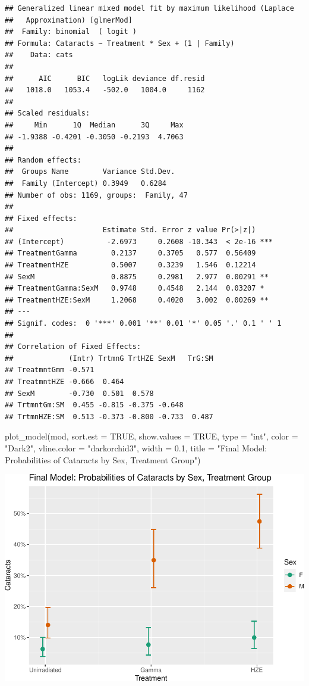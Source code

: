 \documentclass[
]{article}
\newenvironment{Shaded}{\begin{snugshade}}{\end{snugshade}}
\newcommand{\AttributeTok}[1]{\textcolor[rgb]{0.77,0.63,0.00}{#1}}
\newcommand{\ConstantTok}[1]{\textcolor[rgb]{0.00,0.00,0.00}{#1}}
\newcommand{\FloatTok}[1]{\textcolor[rgb]{0.00,0.00,0.81}{#1}}
\newcommand{\FunctionTok}[1]{\textcolor[rgb]{0.00,0.00,0.00}{#1}}
\newcommand{\NormalTok}[1]{#1}
\newcommand{\StringTok}[1]{\textcolor[rgb]{0.31,0.60,0.02}{#1}}
\begin{document}
\begin{verbatim}
## Generalized linear mixed model fit by maximum likelihood (Laplace
##   Approximation) [glmerMod]
##  Family: binomial  ( logit )
## Formula: Cataracts ~ Treatment * Sex + (1 | Family)
##    Data: cats
## 
##      AIC      BIC   logLik deviance df.resid 
##   1018.0   1053.4   -502.0   1004.0     1162 
## 
## Scaled residuals: 
##     Min      1Q  Median      3Q     Max 
## -1.9388 -0.4201 -0.3050 -0.2193  4.7063 
## 
## Random effects:
##  Groups Name        Variance Std.Dev.
##  Family (Intercept) 0.3949   0.6284  
## Number of obs: 1169, groups:  Family, 47
## 
## Fixed effects:
##                     Estimate Std. Error z value Pr(>|z|)    
## (Intercept)          -2.6973     0.2608 -10.343  < 2e-16 ***
## TreatmentGamma        0.2137     0.3705   0.577  0.56409    
## TreatmentHZE          0.5007     0.3239   1.546  0.12214    
## SexM                  0.8875     0.2981   2.977  0.00291 ** 
## TreatmentGamma:SexM   0.9748     0.4548   2.144  0.03207 *  
## TreatmentHZE:SexM     1.2068     0.4020   3.002  0.00269 ** 
## ---
## Signif. codes:  0 '***' 0.001 '**' 0.01 '*' 0.05 '.' 0.1 ' ' 1
## 
## Correlation of Fixed Effects:
##             (Intr) TrtmnG TrtHZE SexM   TrG:SM
## TreatmntGmm -0.571                            
## TreatmntHZE -0.666  0.464                     
## SexM        -0.730  0.501  0.578              
## TrtmntGm:SM  0.455 -0.815 -0.375 -0.648       
## TrtmnHZE:SM  0.513 -0.373 -0.800 -0.733  0.487
\end{verbatim}

\begin{Shaded}
\begin{Highlighting}[]
\FunctionTok{plot\_model}\NormalTok{(mod, }\AttributeTok{sort.est =} \ConstantTok{TRUE}\NormalTok{, }\AttributeTok{show.values =} \ConstantTok{TRUE}\NormalTok{, }\AttributeTok{type =} \StringTok{"int"}\NormalTok{,}
           \AttributeTok{color =} \StringTok{"Dark2"}\NormalTok{, }\AttributeTok{vline.color =} \StringTok{"darkorchid3"}\NormalTok{,}
           \AttributeTok{width =} \FloatTok{0.1}\NormalTok{, }\AttributeTok{title =} \StringTok{"Final Model: Probabilities of Cataracts by Sex, Treatment Group"}\NormalTok{)}
\end{Highlighting}
\end{Shaded}

\includegraphics{final_report_files/figure-latex/glmm_ors-1.pdf}
\end{document}
